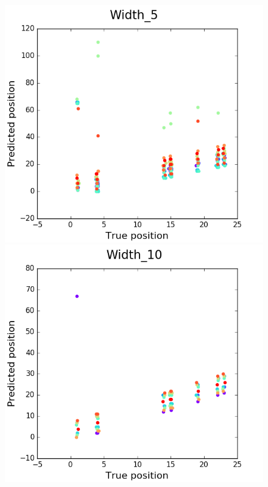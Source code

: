 \documentclass[11pt, oneside]{article}
\begin{document}
\begin{figure}[htbp]
  \centering
  \begin{minipage}{0.32\textwidth}
    \centering
    \includegraphics[width=1\textwidth]{images/Width_5} %
  \end{minipage}
  \hfill
  \begin{minipage}{0.32\textwidth}
    \centering
    \includegraphics[width=1\textwidth]{images/Width_10} %

\end{minipage}
\end{figure}
\end{document}
